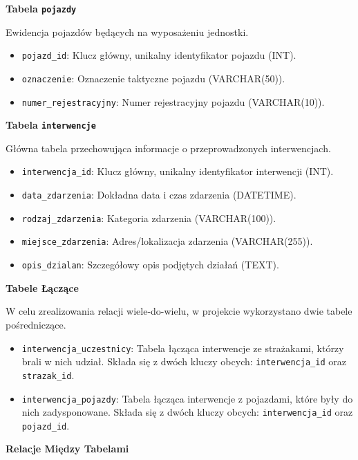 \textbf{Tabela \texttt{pojazdy}}


Ewidencja pojazdów będących na wyposażeniu jednostki.
\begin{itemize}
    \item \texttt{pojazd\_id}: Klucz główny, unikalny identyfikator pojazdu (INT).
    \item \texttt{oznaczenie}: Oznaczenie taktyczne pojazdu (VARCHAR(50)).
    \item \texttt{numer\_rejestracyjny}: Numer rejestracyjny pojazdu (VARCHAR(10)).
\end{itemize}

\textbf{Tabela \texttt{interwencje}}


Główna tabela przechowująca informacje o przeprowadzonych interwencjach.
\begin{itemize}
    \item \texttt{interwencja\_id}: Klucz główny, unikalny identyfikator interwencji (INT).
    \item \texttt{data\_zdarzenia}: Dokładna data i czas zdarzenia (DATETIME).
    \item \texttt{rodzaj\_zdarzenia}: Kategoria zdarzenia (VARCHAR(100)).
    \item \texttt{miejsce\_zdarzenia}: Adres/lokalizacja zdarzenia (VARCHAR(255)).
    \item \texttt{opis\_dzialan}: Szczegółowy opis podjętych działań (TEXT).
\end{itemize}

\textbf{Tabele Łączące}


W celu zrealizowania relacji wiele-do-wielu, w projekcie wykorzystano dwie tabele pośredniczące.
\begin{itemize}
    \item \texttt{interwencja\_uczestnicy}: Tabela łącząca interwencje ze strażakami, którzy brali w nich udział. Składa się z dwóch kluczy obcych: \texttt{interwencja\_id} oraz \texttt{strazak\_id}.
    \item \texttt{interwencja\_pojazdy}: Tabela łącząca interwencje z pojazdami, które były do nich zadysponowane. Składa się z dwóch kluczy obcych: \texttt{interwencja\_id} oraz \texttt{pojazd\_id}.
\end{itemize}

\textbf{Relacje Między Tabelami}


